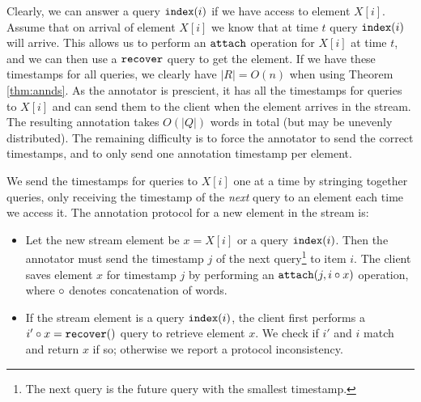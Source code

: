 Clearly, we can answer a query $\mathtt{index}(i)$ if we have access to element $X[i]$. Assume that on arrival of element $X[i]$ we know that at time $t$ query $\mathtt{index}(i)$ will arrive. This allows us to perform an $\mathtt{attach}$ operation for $X[i]$ at time $t$, and we can then use a $\mathtt{recover}$ query to get the element. If we have these timestamps for all queries, we clearly have $|R| = O(n)$ when using Theorem \ref{thm:annds}. 
As the annotator is prescient, it has all the timestamps for queries to $X[i]$ and can send them to the client when the element arrives in the stream. The resulting annotation takes $O(|Q|)$ words in total (but may be unevenly distributed). The remaining difficulty is to force the annotator to send the correct timestamps, and to only send one annotation timestamp per element.

We send the timestamps for queries to $X[i]$ one at a time by stringing together queries, only receiving the timestamp of the \emph{next} query to an element each time we access it. The annotation protocol for a new element in the stream is:

\begin{itemize}
    \item Let the new stream element be $x = X[i]$ or a query $\mathtt{index}(i)$. Then the annotator must send the timestamp $j$ of the next query\footnote{The next query is the future query with the smallest timestamp.} to item $i$. 
    The client saves element $x$ for timestamp $j$ by performing an $\mathtt{attach}(j, i \circ x)$ operation, where $\circ$ denotes concatenation of words. 
    \item If the stream element is a query $\mathtt{index}(i)$, the client first performs a $i' \circ x = \mathtt{recover}()$ query to retrieve element $x$. We check if $i'$ and $i$ match and return $x$ if so; otherwise we report a protocol inconsistency.
\end{itemize}

    

